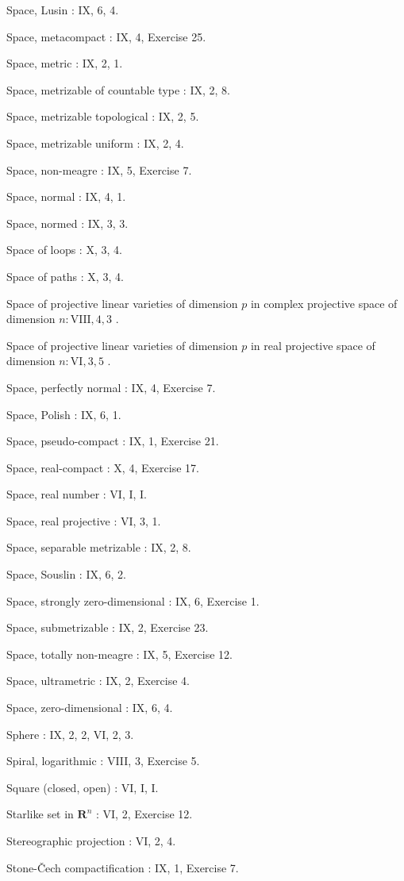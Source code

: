 Space, Lusin : IX, 6, 4.

Space, metacompact : IX, 4, Exercise 25.

Space, metric : IX, 2, 1.

Space, metrizable of countable type : IX, 2, 8.

Space, metrizable topological : IX, 2, 5.

Space, metrizable uniform : IX, 2, 4.

Space, non-meagre : IX, 5, Exercise 7.

Space, normal : IX, 4, 1.

Space, normed : IX, 3, 3.

Space of loops : X, 3, 4.

Space of paths : X, 3, 4.

Space of projective linear varieties of dimension \(p\) in complex projective space of dimension \(n: \text{VIII}, 4, 3\) .

Space of projective linear varieties of dimension \(p\) in real projective space of dimension \(n: \mathrm{VI}, 3, 5\) .

Space, perfectly normal : IX, 4, Exercise 7.

Space, Polish : IX, 6, 1.

Space, pseudo-compact : IX, 1, Exercise 21.

Space, real-compact : X, 4, Exercise 17.

Space, real number : VI, I, I.

Space, real projective : VI, 3, 1.

Space, separable metrizable : IX, 2, 8.

Space, Souslin : IX, 6, 2.

Space, strongly zero-dimensional : IX, 6, Exercise 1.

Space, submetrizable : IX, 2, Exercise 23.

Space, totally non-meagre : IX, 5, Exercise 12.

Space, ultrametric : IX, 2, Exercise 4.

Space, zero-dimensional : IX, 6, 4.

Sphere : IX, 2, 2, VI, 2, 3.

Spiral, logarithmic : VIII, 3, Exercise 5.

Square (closed, open) : VI, I, I.

Starlike set in \(\mathbf{R}^n\) : VI, 2, Exercise 12.

Stereographic projection : VI, 2, 4.

Stone-Čech compactification : IX, 1, Exercise 7.

